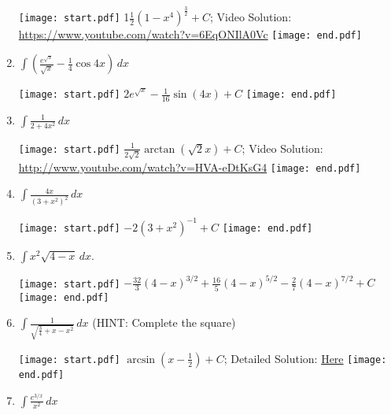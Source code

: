 \documentclass[12pt]{article}
\begin{document}
\begin{enumerate}
\texttt{[image: start.pdf]}
{{{1\linewidth}{$\frac{1}{2}(1-x^{4})^{\frac{3}{2}}+C$; %
Video Solution: \textcolor{blue}{\href{https://www.youtube.com/watch?v=6EqONIlA0Vc}{https://www.youtube.com/watch?v=6EqONIlA0Vc}}}}}
\texttt{[image: end.pdf]}


\item $\int \left(\frac{e^{\sqrt{x}}}{\sqrt{x}}-\frac{1}{4}\cos{4x}\right) \,dx$ 

\texttt{[image: start.pdf]}
{{$2e^{\sqrt{x}}-\frac{1}{16}\sin{(4x)}+C$}}
\texttt{[image: end.pdf]}


\item $\int \frac{1}{2+4x^2} \,dx$ 

\texttt{[image: start.pdf]}
{{$\frac{1}{2\sqrt{2}}\arctan{(\sqrt{2}x)}+C$; Video Solution: \textcolor{blue}{\href{http://www.youtube.com/watch?v=HVA-eDtKsG4}{http://www.youtube.com/watch?v=HVA-eDtKsG4}} %
}}
\texttt{[image: end.pdf]}


\item $\int \frac{4x}{(3+x^2)^2} \,dx$ 

\texttt{[image: start.pdf]}
{{$-2(3+x^2)^{-1}+C$}}
\texttt{[image: end.pdf]}


\item $\int x^2\sqrt{4-x} \,dx$. 

\texttt{[image: start.pdf]}
{{$-\frac{32}{3}(4-x)^{3/2}+\frac{16}{5}(4-x)^{5/2}-\frac{2}{7}(4-x)^{7/2}+C$}}
\texttt{[image: end.pdf]}


\newpage

\item $\int \frac{1}{\sqrt{\frac{3}{4}+x-x^2}} \,dx$ (HINT: Complete the square)

\texttt{[image: start.pdf]}
{{$\arcsin{\left(x-\frac{1}{2}\right)}+C$; Detailed Solution: \textcolor{blue}{\href{http://www.math.drexel.edu/classes/Calculus/resources/Math122HW/Solutions/122_05_Substitution_15.pdf}{Here}}}}
\texttt{[image: end.pdf]}


\item $\int{\frac{e^{3/x}}{x^2}} \,dx$


\end{enumerate}
\end{document}
